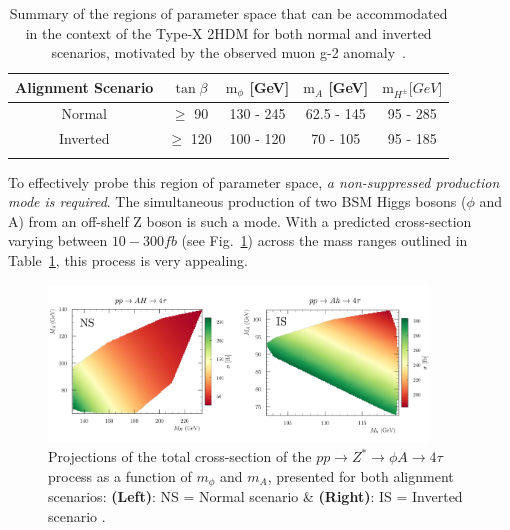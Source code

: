 \begin{table}[h]
\centering
\renewcommand{\arraystretch}{1.5} %
\setlength{\tabcolsep}{12pt} %
\begin{tabular}{|c|c|c|c|c|}
\hline
Alignment Scenario & $\tan{\beta}$ & $\text{m}_\phi$ {[}GeV{]} & $\text{m}_A$ {[}GeV{]} & $\text{m}_{H^\pm} {[}GeV{]}$ \\ \hline \hline
Normal             & $\geq$ 90     & 130 - 245                 & 62.5 - 145             & 95 - 285                     \\ \arrayrulecolor{lightgray} \hline
Inverted           & $\geq$ 120    & 100 - 120                 & 70 - 105               & 95 - 185 \\ \arrayrulecolor{black} \hline
\end{tabular}
\caption[Allowed parameter space for Type-X Two-Higgs Doublet Model scenarios accommodating the muon g-2]{Summary of the regions of parameter space that can be accommodated in the context of the Type-X 2HDM for both normal and inverted scenarios, motivated by the observed muon g-2 anomaly~\cite{TypeX_2HDM}.}
\label{Table:Chapter2_TypeX-ParameterSpace}
\end{table}

To effectively probe this region of parameter space, \textit{a non-suppressed production mode is required}. The simultaneous production of two \ac{BSM} Higgs bosons ($\phi$ and A) from an off-shelf Z boson is such a mode. With a predicted cross-section varying between $10-300\unit{fb}$ (see Fig.~\ref{Figure:Chapter2_4tau_ProductionXS}) across the mass ranges outlined in Table~\ref{Table:Chapter2_TypeX-ParameterSpace}, this process is very appealing. 

\begin{figure}[h]
\centering
    \includegraphics[width= 0.9\textwidth]{Figures/Chapter2/4tau_Production_XS.pdf}
    \caption[Projections of the total cross-section of the $pp \to Z^* \to \phi A \to 4\tau$ process]{Projections of the total cross-section of the $pp \to Z^* \to \phi A \to 4\tau$ process as a function of $m_\phi$ and $m_A$, presented for both alignment scenarios: \textbf{(Left)}: NS = Normal scenario \& \textbf{(Right)}: IS = Inverted scenario \cite{TypeX_2HDM}.}
    \label{Figure:Chapter2_4tau_ProductionXS}
\end{figure}


